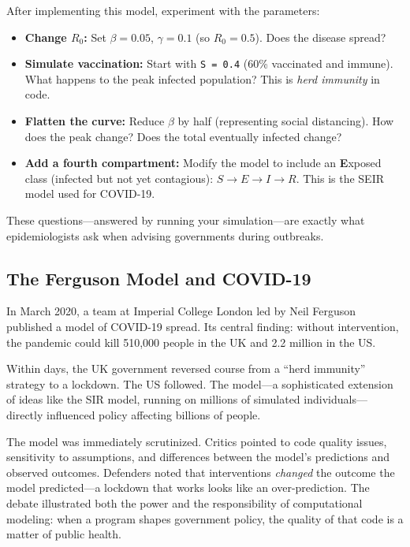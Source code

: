 \documentclass[11pt,letterpaper]{article}
\begin{document}
\begin{tipbox}
After implementing this model, experiment with the parameters:
\begin{itemize}[itemsep=3pt]
    \item \textbf{Change $R_0$:} Set $\beta = 0.05$, $\gamma = 0.1$ (so $R_0 = 0.5$). Does the disease spread?
    \item \textbf{Simulate vaccination:} Start with \texttt{S = 0.4} (60\% vaccinated and immune). What happens to the peak infected population? This is \textit{herd immunity} in code.
    \item \textbf{Flatten the curve:} Reduce $\beta$ by half (representing social distancing). How does the peak change? Does the total eventually infected change?
    \item \textbf{Add a fourth compartment:} Modify the model to include an \textbf{E}xposed class (infected but not yet contagious): $S \to E \to I \to R$. This is the SEIR model used for COVID-19.
\end{itemize}
These questions---answered by running your simulation---are exactly what epidemiologists ask when advising governments during outbreaks.
\end{tipbox}

\subsection{The Ferguson Model and COVID-19}

\begin{historybox}
In March 2020, a team at Imperial College London led by Neil Ferguson published a model of COVID-19 spread. Its central finding: without intervention, the pandemic could kill 510,000 people in the UK and 2.2 million in the US.

Within days, the UK government reversed course from a ``herd immunity'' strategy to a lockdown. The US followed. The model---a sophisticated extension of ideas like the SIR model, running on millions of simulated individuals---directly influenced policy affecting billions of people.

The model was immediately scrutinized. Critics pointed to code quality issues, sensitivity to assumptions, and differences between the model's predictions and observed outcomes. Defenders noted that interventions \textit{changed} the outcome the model predicted---a lockdown that works looks like an over-prediction. The debate illustrated both the power and the responsibility of computational modeling: when a program shapes government policy, the quality of that code is a matter of public health.
\end{historybox}
\end{document}
